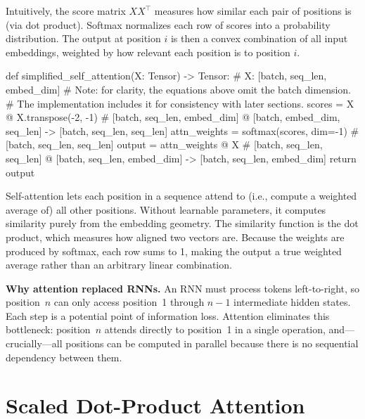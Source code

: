 Intuitively, the score matrix $X X^\top$ measures how similar each pair of
positions is (via dot product). Softmax normalizes each row of scores into a
probability distribution. The output at position $i$ is then a convex combination
of all input embeddings, weighted by how relevant each position is to position $i$.

\begin{pseudocode}
def simplified_self_attention(X: Tensor) -> Tensor:
    # X: [batch, seq_len, embed_dim]
    # Note: for clarity, the equations above omit the batch dimension.
    # The implementation includes it for consistency with later sections.
    scores = X @ X.transpose(-2, -1)  # [batch, seq_len, embed_dim] @ [batch, embed_dim, seq_len] -> [batch, seq_len, seq_len]
    attn_weights = softmax(scores, dim=-1)  # [batch, seq_len, seq_len]
    output = attn_weights @ X  # [batch, seq_len, seq_len] @ [batch, seq_len, embed_dim] -> [batch, seq_len, embed_dim]
    return output
\end{pseudocode}

\begin{keyconcept}
  Self-attention lets each position in a sequence attend to (i.e.,
  compute a weighted average of) all other positions. Without learnable
  parameters, it computes similarity purely from the embedding geometry.
  The similarity function is the dot product, which measures how aligned
  two vectors are. Because the weights are produced by softmax, each row
  sums to 1, making the output a true weighted average rather than an
  arbitrary linear combination.
\end{keyconcept}

\begin{keyconcept}
  \textbf{Why attention replaced RNNs.}
  An RNN must process tokens left-to-right, so position~$n$ can only
  access position~1 through $n{-}1$ intermediate hidden states. Each
  step is a potential point of information loss. Attention eliminates this
  bottleneck: position~$n$ attends directly to position~1 in a single
  operation, and---crucially---all positions can be computed in parallel
  because there is no sequential dependency between them.
\end{keyconcept}

\section{Scaled Dot-Product Attention\label{sec:scaled-dot-product}}

